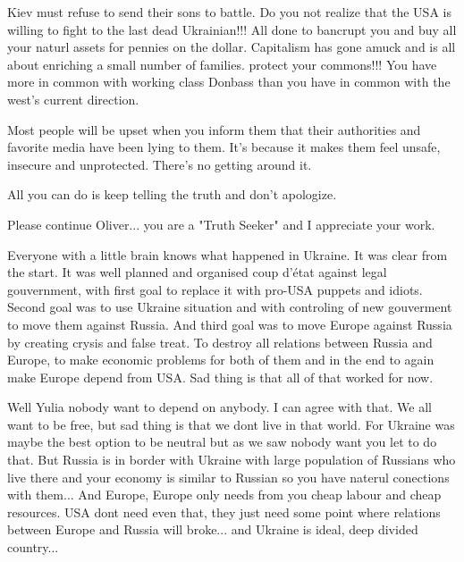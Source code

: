 \begin{itemize}
\begin{itemize}

Kiev must refuse to send their sons to battle. Do you not realize that the USA
is willing to fight to the last dead Ukrainian!!! All done to bancrupt you and
buy all your naturl assets for pennies on the dollar. Capitalism has gone amuck
and is all about enriching a small number of families. protect your commons!!!
You have more in common with working class Donbass than you have in common with
the west's current direction.

\end{itemize} %


Most people will be upset when you inform them that their authorities and
favorite media have been lying to them. It's because it makes them feel unsafe,
insecure and unprotected. There's no getting around it.

All you can do is keep telling the truth and don't apologize.


Please continue Oliver... you are a "Truth Seeker" and I appreciate your work.


Everyone with a little brain knows what happened in Ukraine. It was clear from
the start. It was well planned and organised coup d'état against legal
gouvernment, with first goal to replace it with pro-USA puppets and idiots.
Second goal was to use Ukraine situation and with controling of new gouverment
to move them against Russia. And third goal was to move Europe against Russia
by creating crysis and false treat. To destroy all relations between Russia and
Europe, to make economic problems for both of them and in the end to again make
Europe depend from USA. Sad thing is that all of that worked for now.

\begin{itemize} %

Well Yulia nobody want to depend on anybody. I can agree with that. We all want
to be free, but sad thing is that we dont live in that world. For Ukraine was
maybe the best option to be neutral but as we saw nobody want you let to do
that. But Russia is in border with Ukraine with large population of Russians
who live there and your economy is similar to Russian so you have naterul
conections with them... And Europe, Europe only needs from you cheap labour and
cheap resources. USA dont need even that, they just need some point where
relations between Europe and Russia will broke... and Ukraine is ideal, deep
divided country...


\end{itemize}
\end{itemize}
